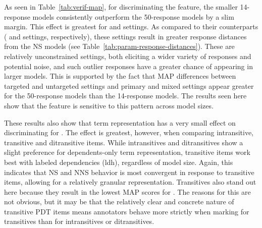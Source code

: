 As seen in Table~\ref{tab:verif-map}, for discriminating the  feature, the smaller 14-response models consistently outperform the 50-response models by a slim margin. This effect is greatest for  and  settings. As compared to their counterparts ( and  settings, respectively), these settings result in greater response distances from the NS models (see Table~\ref{tab:param-response-distances}). These are relatively unconstrained settings, both eliciting a wider variety of responses and potential noise, and such outlier responses have a greater chance of appearing in larger models. This is supported by the fact that MAP differences between targeted and untargeted settings and primary and mixed settings appear greater for the 50-response models than the 14-response models. The results seen here show that the  feature is sensitive to this pattern across model sizes. 

These results also show that term representation has a very small effect on discriminating for . The effect is greatest, however, when comparing intransitive, transitive and ditransitive items. While intransitives and ditransitives show a slight preference for dependents-only term representation, transitive items 
work best with labeled dependencies (ldh), regardless of model size. Again, this indicates that NS and NNS behavior is most convergent in response to transitive items, allowing for a relatively granular representation. Transitives also stand out here because they result in the lowest MAP scores for . The reasons for this are not obvious, but it may be that the relatively clear and concrete nature of transitive PDT items means annotators behave more strictly when marking  for transitives than for intransitives or ditransitives.


